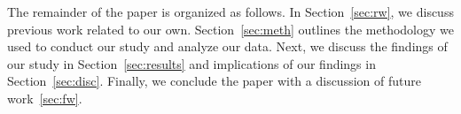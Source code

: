\documentclass[conference]{IEEEtran}
\begin{document}
The remainder of the paper is organized as follows. 
In Section~\ref{sec:rw}, we discuss previous work related to our own. 
Section~\ref{sec:meth} outlines the methodology we used to conduct our study and analyze our data. 
Next, we discuss the findings of our study in Section~\ref{sec:results} and implications of our findings in Section~\ref{sec:disc}. 
Finally, we conclude the paper with a discussion of future work~\ref{sec:fw}.



%
%



%
%
\end{document}
